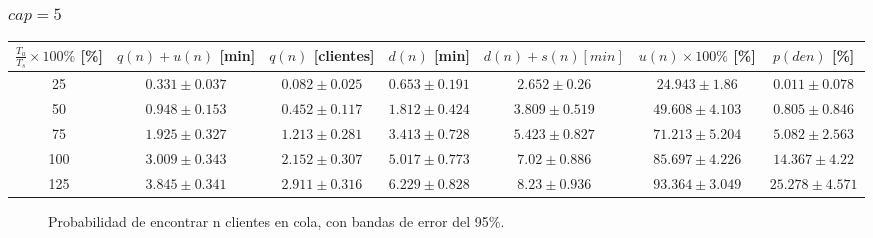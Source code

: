\subsubsection[cap = 5]{$cap = 5$}

\begin{small}
  \begin{tabular}{||c||c|c|c|c|c|c||}
    \hline \hline
    $\frac{T_a}{T_s}\times100\%$ [\%] & $q(n)+u(n)$ [min] & $q(n)$ [clientes] & $d(n)$ [min] & $d(n)+s(n) [min]$ & $u(n)\times100\%$ [\%] & $p(den)$ [\%] \\
    \hline \hline
    25 & $0.331 \pm 0.037$ & $0.082 \pm 0.025$ & $0.653 \pm 0.191$ & $2.652 \pm 0.26$ & $24.943 \pm 1.86$ & $0.011 \pm 0.078$ \\
    \hline
    50 & $0.948 \pm 0.153$ & $0.452 \pm 0.117$ & $1.812 \pm 0.424$ & $3.809 \pm 0.519$ & $49.608 \pm 4.103$ & $0.805 \pm 0.846$ \\
    \hline
    75 & $1.925 \pm 0.327$ & $1.213 \pm 0.281$ & $3.413 \pm 0.728$ & $5.423 \pm 0.827$ & $71.213 \pm 5.204$ & $5.082 \pm 2.563$ \\
    \hline
    100 & $3.009 \pm 0.343$ & $2.152 \pm 0.307$ & $5.017 \pm 0.773$ & $7.02 \pm 0.886$ & $85.697 \pm 4.226$ & $14.367 \pm 4.22$ \\
    \hline
    125 & $3.845 \pm 0.341$ & $2.911 \pm 0.316$ & $6.229 \pm 0.828$ & $8.23 \pm 0.936$ & $93.364 \pm 3.049$ & $25.278 \pm 4.571$ \\
    \hline \hline
  \end{tabular}
\end{small}

\begin{figure}[H]
  \centering
  \begin{subfigure}{0.267\linewidth}
  \end{subfigure}\hspace{0.35cm}
  \begin{subfigure}{0.267\linewidth}
  \end{subfigure}\hspace{0.35cm}
  \begin{subfigure}{0.267\linewidth}
  \end{subfigure}
  \begin{subfigure}{0.267\linewidth}
  \end{subfigure}\hspace{0.35cm}
  \begin{subfigure}{0.267\linewidth}
  \end{subfigure}
  \caption{Probabilidad de encontrar n clientes en cola, con bandas de error del 95\%.}
\end{figure}

